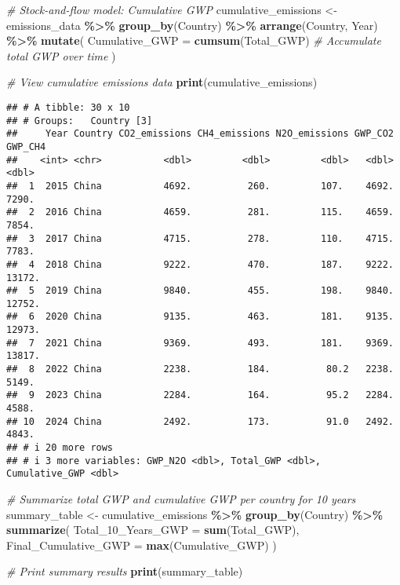 \documentclass[
]{article}
\newenvironment{Shaded}{\begin{snugshade}}{\end{snugshade}}
\newcommand{\AttributeTok}[1]{\textcolor[rgb]{0.13,0.29,0.53}{#1}}
\newcommand{\CommentTok}[1]{\textcolor[rgb]{0.56,0.35,0.01}{\textit{#1}}}
\newcommand{\FunctionTok}[1]{\textcolor[rgb]{0.13,0.29,0.53}{\textbf{#1}}}
\newcommand{\NormalTok}[1]{#1}
\newcommand{\OtherTok}[1]{\textcolor[rgb]{0.56,0.35,0.01}{#1}}
\newcommand{\SpecialCharTok}[1]{\textcolor[rgb]{0.81,0.36,0.00}{\textbf{#1}}}
\begin{document}
\begin{Shaded}
\begin{Highlighting}[]
\CommentTok{\# Stock{-}and{-}flow model: Cumulative GWP}
\NormalTok{cumulative\_emissions }\OtherTok{\textless{}{-}}\NormalTok{ emissions\_data }\SpecialCharTok{\%\textgreater{}\%}
  \FunctionTok{group\_by}\NormalTok{(Country) }\SpecialCharTok{\%\textgreater{}\%}
  \FunctionTok{arrange}\NormalTok{(Country, Year) }\SpecialCharTok{\%\textgreater{}\%}
  \FunctionTok{mutate}\NormalTok{(}
    \AttributeTok{Cumulative\_GWP =} \FunctionTok{cumsum}\NormalTok{(Total\_GWP) }\CommentTok{\# Accumulate total GWP over time}
\NormalTok{  )}

\CommentTok{\# View cumulative emissions data}
\FunctionTok{print}\NormalTok{(cumulative\_emissions)}
\end{Highlighting}
\end{Shaded}

\begin{verbatim}
## # A tibble: 30 x 10
## # Groups:   Country [3]
##     Year Country CO2_emissions CH4_emissions N2O_emissions GWP_CO2 GWP_CH4
##    <int> <chr>           <dbl>         <dbl>         <dbl>   <dbl>   <dbl>
##  1  2015 China           4692.          260.         107.    4692.   7290.
##  2  2016 China           4659.          281.         115.    4659.   7854.
##  3  2017 China           4715.          278.         110.    4715.   7783.
##  4  2018 China           9222.          470.         187.    9222.  13172.
##  5  2019 China           9840.          455.         198.    9840.  12752.
##  6  2020 China           9135.          463.         181.    9135.  12973.
##  7  2021 China           9369.          493.         181.    9369.  13817.
##  8  2022 China           2238.          184.          80.2   2238.   5149.
##  9  2023 China           2284.          164.          95.2   2284.   4588.
## 10  2024 China           2492.          173.          91.0   2492.   4843.
## # i 20 more rows
## # i 3 more variables: GWP_N2O <dbl>, Total_GWP <dbl>, Cumulative_GWP <dbl>
\end{verbatim}

\begin{Shaded}
\begin{Highlighting}[]
\CommentTok{\# Summarize total GWP and cumulative GWP per country for 10 years}
\NormalTok{summary\_table }\OtherTok{\textless{}{-}}\NormalTok{ cumulative\_emissions }\SpecialCharTok{\%\textgreater{}\%}
  \FunctionTok{group\_by}\NormalTok{(Country) }\SpecialCharTok{\%\textgreater{}\%}
  \FunctionTok{summarize}\NormalTok{(}
    \AttributeTok{Total\_10\_Years\_GWP =} \FunctionTok{sum}\NormalTok{(Total\_GWP),}
    \AttributeTok{Final\_Cumulative\_GWP =} \FunctionTok{max}\NormalTok{(Cumulative\_GWP)}
\NormalTok{  )}

\CommentTok{\# Print summary results}
\FunctionTok{print}\NormalTok{(summary\_table)}
\end{Highlighting}
\end{Shaded}
\end{document}
